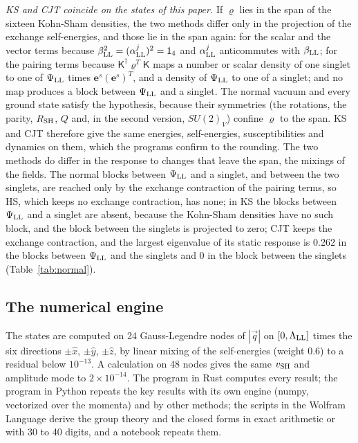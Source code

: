 \documentclass[aps,prd,onecolumn,superscriptaddress,nofootinbib,floatfix,longbibliography]{revtex4-2}
\newcommand{\LL}{{\rm LL}}
\newcommand{\SH}{{\rm SH}}
\begin{document}
\emph{KS and CJT coincide on the states of this paper.} If $\varrho$ lies in the span of the sixteen Kohn-Sham densities,
the two methods differ only in the projection of the exchange self-energies, and those lie in the span again: for the
scalar and the vector terms because $\beta_\LL^2=(\alpha^j_\LL)^2=\mathsf 1_4$ and $\alpha^j_\LL$ anticommutes with $\beta_\LL$;
for the pairing terms because $\mathsf K^\dagger\varrho^T\mathsf K$ maps a number or scalar density of one singlet to one of
$\Psi_\LL$ times $\mathbf e^s(\mathbf e^s)^T$, and a density of $\Psi_\LL$ to one of a singlet; and no map produces a block
between $\Psi_\LL$ and a singlet. The normal vacuum and every ground state satisfy the hypothesis, because their symmetries
(the rotations, the parity, $R_\SH$, $Q$ and, in the second version, $SU(2)_V$) confine $\varrho$ to the span. KS and CJT
therefore give the same energies, self-energies, susceptibilities and dynamics on them, which the programs confirm to the
rounding. The two methods do differ in the response to changes that leave the span, the mixings of the fields. The
normal blocks between $\Psi_\LL$ and a singlet, and between the two singlets, are reached only by the exchange contraction
of the pairing terms, so HS, which keeps no exchange contraction, has none; in KS the blocks between $\Psi_\LL$ and a
singlet are absent, because the Kohn-Sham densities have no such block, and the block between the singlets is projected
to zero; CJT keeps the exchange contraction, and the largest eigenvalue of its static response is 0.262 in the
blocks between $\Psi_\LL$ and the singlets and 0 in the block between the singlets (Table~\ref{tab:normal}).

\subsection{The numerical engine}

The states are computed on 24 Gauss-Legendre nodes of $|\vec q|$ on $[0,\Lambda_\LL]$ times the six directions
$\pm\hat x$, $\pm\hat y$, $\pm\hat z$, by linear mixing of the self-energies (weight 0.6) to a residual below
$10^{-13}$. A calculation on 48 nodes gives the same $v_\SH$ and amplitude mode to \ensuremath{2\times10^{-14}}. The program in Rust
computes every result; the program in Python repeats the key results with its own engine (numpy, vectorized over the
momenta) and by other methods; the scripts in the Wolfram Language derive the group theory and the closed forms in exact
arithmetic or with 30 to 40 digits, and a notebook repeats them.
\end{document}
